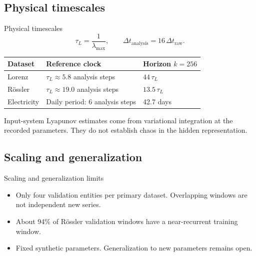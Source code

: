\documentclass[aspectratio=169,11pt]{beamer}
\begin{document}
\subsection{Physical timescales}
\begin{frame}{Physical timescales}
\[
 \tau_L=\frac1{\lambda_{\max}},\qquad
 \Delta t_{\mathrm{analysis}}=16\,\Delta t_{\mathrm{raw}}.
\]
\begin{table}
\centering
\begin{tabular}{lll}
\toprule
Dataset & Reference clock & Horizon $k=256$ \\
\midrule
Lorenz & $\tau_L\approx5.8$ analysis steps & $44\,\tau_L$ \\
R\"ossler & $\tau_L\approx19.0$ analysis steps & $13.5\,\tau_L$ \\
Electricity & Daily period: 6 analysis steps & 42.7 days \\
\bottomrule
\end{tabular}
\end{table}
Input-system Lyapunov estimates come from variational integration at the recorded parameters.
They do not establish chaos in the hidden representation.
\end{frame}

\subsection{Scaling and generalization}
\begin{frame}{Scaling and generalization limits}
\begin{table}
\centering\small

\caption{Four-step $R^2$. Std.: training coordinate scaling. White PC: whitened training PCA95. Neural entries average three seeds.}
\end{table}
\begin{itemize}
\item Only four validation entities per primary dataset. Overlapping windows are not independent new series.
\item About 94\% of R\"ossler validation windows have a near-recurrent training window.
\item Fixed synthetic parameters. Generalization to new parameters remains open.
\end{itemize}
\end{frame}
\end{document}

